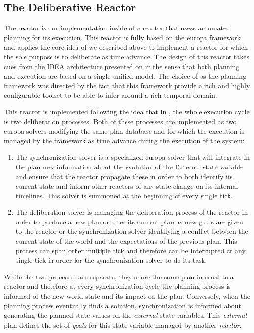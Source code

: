 \subsection{The  \eu Deliberative Reactor}
\label{sec:arch:europa}

The \eu reactor is our implementation inside \rx of a reactor that
usess automated planning for its execution. This reactor is fully
based on the europa framework and applies the core idea of \rx we
described above to implement a reactor for which the sole purpose is
to deliberate as time advance. The design of this reactor takes cues
from the IDEA architecture presented on \cite{mus02, mus06} in the
sense that both planning and execution are based on a single unified
model. The choice of \eu as the planning framework was directed by the
fact that this framework provide a rich and highly configurable
toolset to be able to infer around a rich temporal domain.

This reactor is implemented following the idea that in \rx, the
whole execution cycle is two deliberation processes. Both of these
processes are implemented as two europa solvers modifying the same
plan database and for which the execution is managed by the \rx 
framework as time advance during the execution of the system:

\begin{enumerate}

\item The synchronization solver is a specialized europa solver that
  will integrate in the plan new information about the evolution of
  the External state variable and ensure that the reactor propagate
  these in order to both identify its current state and inform
  other reactors of any state change on its internal timelines. This
  solver is summoned at the beginning of every single tick.

\item The deliberation solver is managing the deliberation process of
  the reactor in order to produce a new plan or alter its current plan
  as new goals are given to the reactor or the synchronization solver
  identifying a conflict between the current state of the world and
  the expectations of the previous plan. This process can  span other
  multiple tick and therefore can be interrupted at any single tick in
  order for the synchronization solver to do its task.

\end{enumerate}

While the two processes are separate, they share the same plan
internal to a reactor and therefore at every synchronization cycle the
planning process is informed of the new world state and its impact on
the plan. Conversely, when the planning process eventually finds a
solution, synchronization is informed about generating the planned
state values on the {\em external} state variables. This {\em
  external} plan defines the set of {\em goals} for this state
variable managed by another {\em reactor}.

